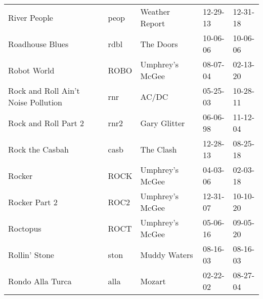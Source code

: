 \begin{longtable}{p{}p{}p{}p{}p{}}
                                                            River People &          peop &                                           Weather Report &              12-29-13 &             12-31-18 \\
                                                         Roadhouse Blues &          rdbl &                                                The Doors &              10-06-06 &             10-06-06 \\
                                                             Robot World &          ROBO &                                          Umphrey's McGee &              08-07-04 &             02-13-20 \\
                                     Rock and Roll Ain't Noise Pollution &           rnr &                                                    AC/DC &              05-25-03 &             10-28-11 \\
                                                    Rock and Roll Part 2 &          rnr2 &                                             Gary Glitter &              06-06-98 &             11-12-04 \\
                                                         Rock the Casbah &          casb &                                                The Clash &              12-28-13 &             08-25-18 \\
                                                                  Rocker &          ROCK &                                          Umphrey's McGee &              04-03-06 &             02-03-18 \\
                                                           Rocker Part 2 &          ROC2 &                                          Umphrey's McGee &              12-31-07 &             10-10-20 \\
                                                                Roctopus &          ROCT &                                          Umphrey's McGee &              05-06-16 &             09-05-20 \\
                                                           Rollin' Stone &          ston &                                             Muddy Waters &              08-16-03 &             08-16-03 \\
                                                        Rondo Alla Turca &          alla &                                                   Mozart &              02-22-02 &             08-27-04 \\

\end{longtable}
